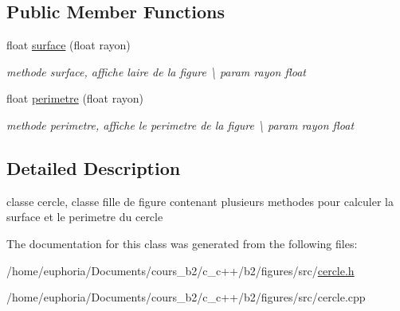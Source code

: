 \subsection*{Public Member Functions}
\begin{DoxyCompactItemize}
\item 
float \hyperlink{classcercle_a140f47009fdc3f4ea8c93641538a3778}{surface} (float rayon)\hypertarget{classcercle_a140f47009fdc3f4ea8c93641538a3778}{}\label{classcercle_a140f47009fdc3f4ea8c93641538a3778}

\begin{DoxyCompactList}\small\item\em methode surface, affiche l\textquotesingle{}aire de la figure \textbackslash{} param rayon float \end{DoxyCompactList}\item 
float \hyperlink{classcercle_a55f5bfa84171ffc0c01bd75df6cbf75e}{perimetre} (float rayon)\hypertarget{classcercle_a55f5bfa84171ffc0c01bd75df6cbf75e}{}\label{classcercle_a55f5bfa84171ffc0c01bd75df6cbf75e}

\begin{DoxyCompactList}\small\item\em methode perimetre, affiche le perimetre de la figure \textbackslash{} param rayon float \end{DoxyCompactList}\end{DoxyCompactItemize}


\subsection{Detailed Description}
classe cercle, classe fille de figure contenant plusieurs methodes pour calculer la surface et le perimetre du cercle 

The documentation for this class was generated from the following files\+:\begin{DoxyCompactItemize}
\item 
/home/euphoria/\+Documents/cours\+\_\+b2/c\+\_\+c++/b2/figures/src/\hyperlink{cercle_8h}{cercle.\+h}\item 
/home/euphoria/\+Documents/cours\+\_\+b2/c\+\_\+c++/b2/figures/src/cercle.\+cpp\end{DoxyCompactItemize}
